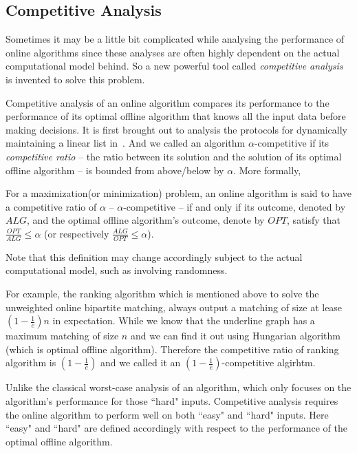 \subsection{Competitive Analysis}

Sometimes it may be a little bit complicated while analysing the performance 
of online algorithms since these analyses are often highly dependent on the
actual computational model behind. So a new powerful tool called
\emph{competitive analysis} is invented to solve this problem.

Competitive analysis of an online algorithm compares its performance to
the performance of its optimal offline algorithm that knows all the input 
data before making decisions. 
It is first brought out to analysis the protocols for dynamically
maintaining a linear list in~\cite{sleator1985amortized}.
And we called an algorithm 
$\alpha$-competitive if its \emph{competitive ratio} 
-- the ratio between its solution and the solution of its optimal offline
algorithm -- is bounded from above/below by $\alpha$. More formally,

\begin{definition}
    For a maximization(or minimization) problem, an online algorithm is said
    to have a competitive ratio of $\alpha$ -- $\alpha$-competitive -- if
    and only if its outcome, denoted by $ALG$, and the optimal offline
    algorithm's outcome, denote by $OPT$, satisfy that
    $\frac{OPT}{ALG} \le \alpha$ 
    (or respectively $\frac{ALG}{OPT} \le \alpha$).
\end{definition}

Note that this definition may change accordingly subject to the actual 
computational model, such as involving randomness.

For example, the ranking algorithm which is mentioned above to solve the
unweighted online bipartite matching, always output a matching of size
at lease $(1 - \frac{1}{e})n$ in expectation. While we know that the
underline graph has a maximum matching of size $n$ and we can find it out
using Hungarian algorithm (which is optimal offline algorithm). 
Therefore the competitive ratio of ranking algorithm is $(1 - \frac{1}{e})$
and we called it an $(1 - \frac{1}{e})$-competitive algirhtm.

Unlike the classical worst-case analysis of an algorithm, which only 
focuses on the algorithm's performance for those ``hard" inputs. Competitive
analysis requires the online algorithm to perform well on both ``easy" and
``hard" inputs. Here ``easy" and ``hard" are defined accordingly with
respect to the performance of the optimal offline algorithm.

